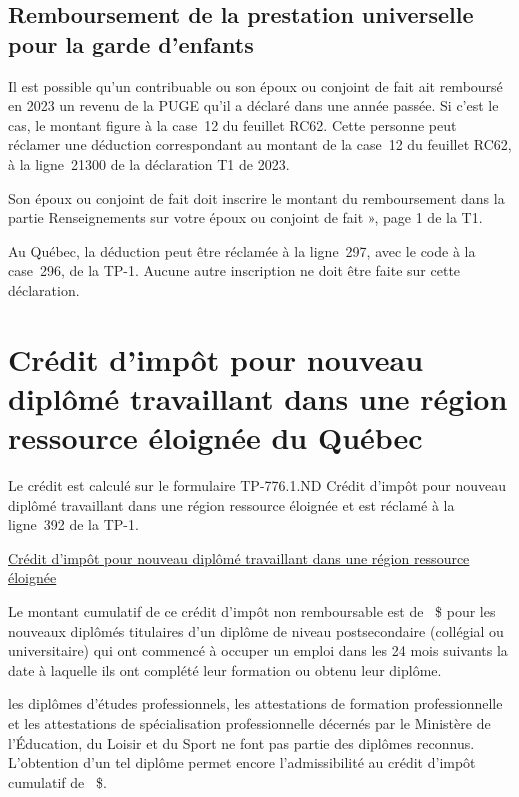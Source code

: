 \subsection{Remboursement de la prestation universelle pour la garde d'enfants}
Il est possible qu'un contribuable ou son époux ou conjoint de fait ait remboursé en 2023 un revenu de la PUGE qu'il a déclaré dans une année passée. Si c'est le cas, le montant figure à la case~12 du feuillet RC62. Cette personne peut réclamer une déduction correspondant au montant de la case~12 du feuillet RC62, à la ligne~21300 de la déclaration T1 de 2023.

Son époux ou conjoint de fait doit inscrire le montant du remboursement dans la partie \og Renseignements sur votre époux ou conjoint de fait », page 1 de la T1. 

Au Québec, la déduction peut être réclamée à la ligne~297, avec le code  \fg{} à la case~296, de la TP-1. Aucune autre inscription ne doit être faite sur cette déclaration.



\section{Crédit d'impôt pour nouveau diplômé travaillant dans une région ressource éloignée du Québec}
Le crédit est calculé sur le formulaire TP-776.1.ND Crédit d'impôt pour nouveau diplômé travaillant dans une région ressource éloignée et est réclamé à la ligne~392 de la TP-1.

\qct\href{https://www.revenuquebec.ca/fr/services-en-ligne/formulaires-et-publications/details-courant/tp-776-1-nd/}{Crédit d'impôt pour nouveau diplômé travaillant dans une région ressource éloignée }

Le montant cumulatif de ce crédit d'impôt non remboursable est de ~\$ pour les nouveaux diplômés titulaires d'un diplôme de niveau postsecondaire (collégial ou universitaire) qui ont commencé à occuper un emploi dans les 24 mois suivants la date à laquelle ils ont complété leur formation ou obtenu leur diplôme.

\begin{note}
	les diplômes d'études professionnels, les attestations de formation professionnelle et les attestations de spécialisation professionnelle décernés par le Ministère de l'Éducation, du Loisir et du Sport ne font pas partie des diplômes reconnus. L'obtention d'un tel diplôme permet encore l'admissibilité au crédit d'impôt cumulatif de ~\$.
\end{note}



